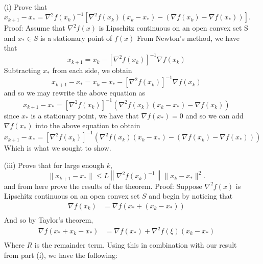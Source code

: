 \documentclass{article}
\begin{document}
\begin{itemize}
    \item[(i)] Prove that
    \[x_{k+1} - x_* = \nabla^2f(x_k)^{-1}[\nabla^2f(x_k)(x_k - x_*) - (\nabla f(x_k) - \nabla f(x_*))].\]
    \newline\newline\newline
    Proof: Assume that $\nabla^2f(x)$ is Lipschitz continuous on an open convex set S and $x_* \in S$ is a stationary point of $f(x)$ From Newton's method, we have that
    \newline
    \[x_{k+1} = x_k - \left[\nabla^2f(x_k)\right]^{-1}\nabla f(x_k)\]
    \newline
    Subtracting $x_*$ from each side, we obtain
    \newline
    \[x_{k+1} - x_* = x_k - x_* - \left[\nabla^2f(x_k)\right]^{-1}\nabla f(x_k)\]
    \newline
    and so we may rewrite the above equation as
    \newline
    \[x_{k+1} - x_* = \left[\nabla^2f(x_k)\right]^{-1}\left(\nabla^2f(x_k)(x_k - x_*) - \nabla f(x_k)\right)\]
    \newline
    since $x_*$ is a stationary point, we have that $\nabla f(x_*) = 0$ and so we can add $\nabla f(x_*)$ into the above equation to obtain
    \newline
    \[x_{k+1} - x_* = \left[\nabla^2f(x_k)\right]^{-1}\left(\nabla^2f(x_k)(x_k - x_*) - (\nabla f(x_k) - \nabla f(x_*))\right)\]
    \newline
    Which is what we sought to show.
    \item[(iii)] Prove that for large enough $k$,
    \[\|x_{k+1} - x_*\| \leq L\left\|\nabla^2f(x_k)^{-1}\right\|\|x_k - x_*\|^2.\]
    and from here prove the results of the theorem.
    \newline\newline
    Proof: Suppose $\nabla^2f(x)$ is Lipschitz continuous on an open convex set $S$ and begin by noticing that
    \begin{align*}
        \nabla f(x_k) &= \nabla f(x_* + (x_k - x_*))\\
    \end{align*}
    And so by Taylor's theorem,
    \begin{align*}
        \nabla f(x_* + x_k - x_*) &= \nabla f(x_*) + \nabla^2f(\xi)(x_k - x_*)\\
    \end{align*}
    Where $R$ is the remainder term. Using this in combination with our result from part (i), we have the following:

\end{itemize}
\end{document}

